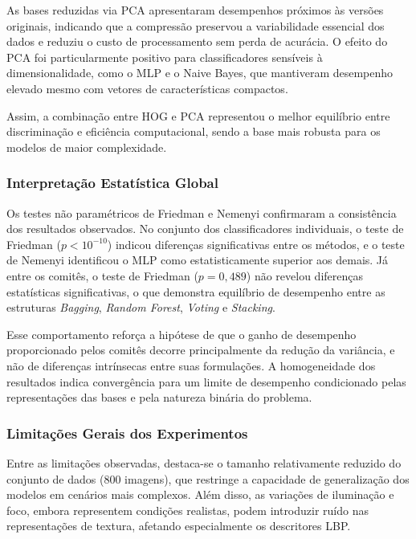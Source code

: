 \documentclass[12pt]{article}
\begin{document}
As bases reduzidas via PCA apresentaram desempenhos próximos às versões originais, indicando que a compressão preservou a variabilidade essencial dos dados e reduziu o custo de processamento sem perda de acurácia. O efeito do PCA foi particularmente positivo para classificadores sensíveis à dimensionalidade, como o MLP e o Naive Bayes, que mantiveram desempenho elevado mesmo com vetores de características compactos.

Assim, a combinação entre HOG e PCA representou o melhor equilíbrio entre discriminação e eficiência computacional, sendo a base mais robusta para os modelos de maior complexidade.

\subsubsection{Interpretação Estatística Global}

Os testes não paramétricos de Friedman e Nemenyi confirmaram a consistência dos resultados observados. No conjunto dos classificadores individuais, o teste de Friedman ($p < 10^{-10}$) indicou diferenças significativas entre os métodos, e o teste de Nemenyi identificou o MLP como estatisticamente superior aos demais. Já entre os comitês, o teste de Friedman ($p = 0{,}489$) não revelou diferenças estatísticas significativas, o que demonstra equilíbrio de desempenho entre as estruturas \textit{Bagging}, \textit{Random Forest}, \textit{Voting} e \textit{Stacking}.

Esse comportamento reforça a hipótese de que o ganho de desempenho proporcionado pelos comitês decorre principalmente da redução da variância, e não de diferenças intrínsecas entre suas formulações. A homogeneidade dos resultados indica convergência para um limite de desempenho condicionado pelas representações das bases e pela natureza binária do problema.

\subsubsection{Limitações Gerais dos Experimentos}

Entre as limitações observadas, destaca-se o tamanho relativamente reduzido do conjunto de dados (800 imagens), que restringe a capacidade de generalização dos modelos em cenários mais complexos. Além disso, as variações de iluminação e foco, embora representem condições realistas, podem introduzir ruído nas representações de textura, afetando especialmente os descritores LBP. 
\end{document}

